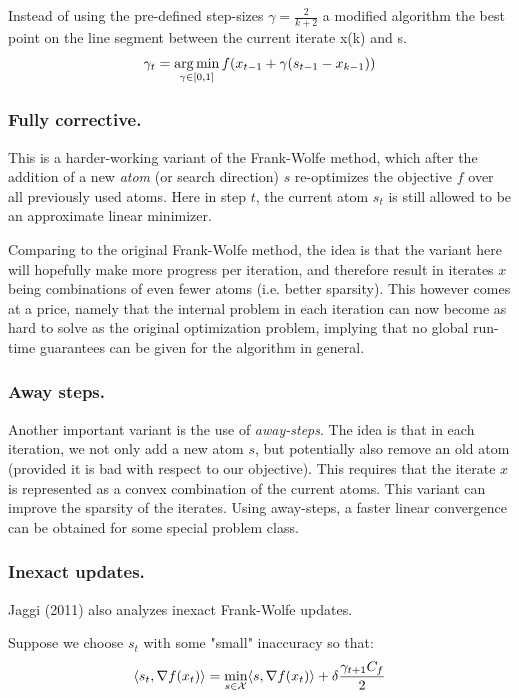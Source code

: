 Instead of using the pre-defined step-sizes $\gamma=\frac{2}{k+2}$ a modified algorithm the best point on the line segment between the current iterate x(k) and s.
\begin{equation}
\gamma_t = \operatorname*{arg\,min}_{\gamma \in [0,1]} f( x_{t-1} + \gamma(s_{t-1}-x_{k-1}) ) \nonumber
\end{equation}

\subsubsection{Fully corrective.}

This is a harder-working variant of the Frank-Wolfe method, which after the addition of a new \emph{atom} (or search direction) $s$ re-optimizes the objective $f$ over all previously used atoms. Here in step $t$, the current atom $s_t$ is still allowed to be an approximate linear minimizer.

Comparing to the original Frank-Wolfe method, the idea is that the variant here will hopefully make more progress per iteration, and therefore result in iterates $x$ being combinations of even fewer atoms (i.e. better sparsity). This however comes at a price, namely that the internal problem in each iteration can now become as hard to solve as the original optimization problem, implying that no global run-time guarantees can be given for the algorithm in general.

\subsubsection{Away steps.}
Another important variant is the use of \emph{away-steps}. The idea is that in each iteration, we not only add a new atom $s$, but potentially also remove an old atom (provided it is bad with respect to our objective). This requires that the iterate $x$ is represented as a convex combination of the current atoms. This variant can improve the sparsity of the iterates. Using away-steps, a faster linear convergence can be obtained for some special problem class.

\subsubsection{Inexact updates.}
Jaggi (2011) also analyzes inexact Frank-Wolfe updates.

Suppose we choose $s_t$ with some "small" inaccuracy so that:
\begin{equation}
      \langle s_t, \nabla f(x_t) \rangle = \min_{s \in \mathcal{X} } \langle s, \nabla f(x_t) \rangle + \delta \frac{\gamma_{t+1}C_f}{2}
\end{equation}

